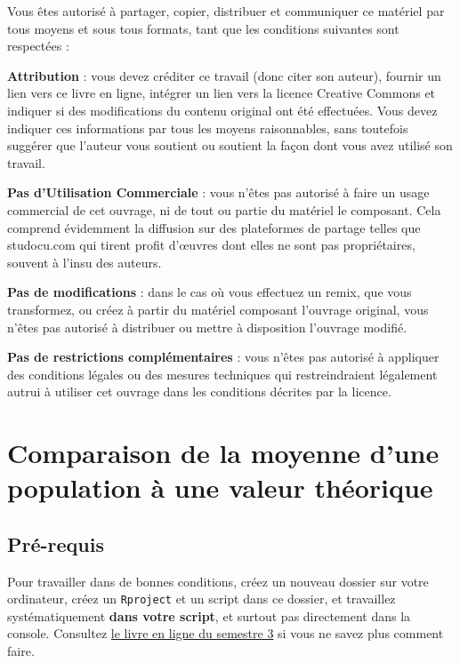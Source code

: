 \documentclass[
  a4paper,
  DIV=11,
  numbers=noendperiod,
  oneside]{scrreprt}
\begin{document}
Vous êtes autorisé à partager, copier, distribuer et communiquer ce
matériel par tous moyens et sous tous formats, tant que les conditions
suivantes sont respectées :

{} \textbf{Attribution} : vous devez
créditer ce travail (donc citer son auteur), fournir un lien vers ce
livre en ligne, intégrer un lien vers la licence Creative Commons et
indiquer si des modifications du contenu original ont été effectuées.
Vous devez indiquer ces informations par tous les moyens raisonnables,
sans toutefois suggérer que l'auteur vous soutient ou soutient la façon
dont vous avez utilisé son travail.

{} \textbf{Pas d'Utilisation Commerciale}
: vous n'êtes pas autorisé à faire un usage commercial de cet ouvrage,
ni de tout ou partie du matériel le composant. Cela comprend évidemment
la diffusion sur des plateformes de partage telles que studocu.com qui
tirent profit d'œuvres dont elles ne sont pas propriétaires, souvent à
l'insu des auteurs.

{} \textbf{Pas de modifications} : dans le
cas où vous effectuez un remix, que vous transformez, ou créez à partir
du matériel composant l'ouvrage original, vous n'êtes pas autorisé à
distribuer ou mettre à disposition l'ouvrage modifié.

{} \textbf{Pas de restrictions complémentaires} :
vous n'êtes pas autorisé à appliquer des conditions légales ou des
mesures techniques qui restreindraient légalement autrui à utiliser cet
ouvrage dans les conditions décrites par la licence.


\hypertarget{sec-moy1}{%
\chapter{Comparaison de la moyenne d'une population à une valeur
théorique}\label{sec-moy1}}

\hypertarget{sec-packages}{%
\section{Pré-requis}\label{sec-packages}}

Pour travailler dans de bonnes conditions, créez un nouveau dossier sur
votre ordinateur, créez un \texttt{Rproject} et un script dans ce
dossier, et travaillez systématiquement \textbf{dans votre script}, et
surtout pas directement dans la console. Consultez
\href{https://besibo.github.io/BiometrieS3/01-R-basics.html\#sec-code}{le
livre en ligne du semestre 3} si vous ne savez plus comment faire.
\end{document}
